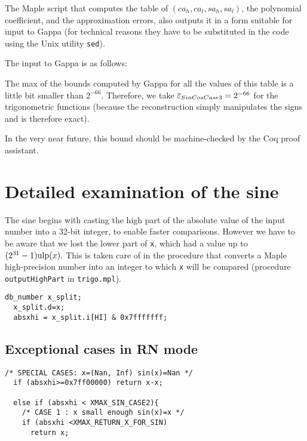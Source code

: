 The Maple script that computes the table of $(ca_h,ca_l,sa_h,sa_l)$,
the polynomial coefficient, and the approximation errors, also outputs
it in a form suitable for input to Gappa (for technical reasons they
have to be substituted in the code using the Unix utility
\texttt{sed}).  

The input to Gappa is as follows:





The max of the bounds computed by Gappa for all the
values of this table is a little bit smaller than $2^{-66}$.
Therefore, we take ${\overline{\varepsilon}}_{SinCosCase3}=2^{-66}$ for the
trigonometric functions (because the reconstruction simply manipulates
the signs and is therefore exact).

In the very near future, this bound should be machine-checked by the
Coq proof assistant.



\section{Detailed examination of the sine}

The sine begins with casting the high part of the absolute value of
the input number into a 32-bit integer, to enable faster comparisons.
However we have to be aware that we lost the lower part of \texttt{x},
which had a value up to $(2^{31}-1)\mbox{ulp}(x)$. This is taken care of in
the procedure that converts a Maple high-precision number into an
integer to which \texttt{x} will be compared (procedure
\texttt{outputHighPart} in \texttt{trigo.mpl}).

\begin{lstlisting}[caption={Casting to an int for faster comparisons \label{lst:trigo:takehighpart}},firstnumber=1]
  db_number x_split;
  x_split.d=x;
  absxhi = x_split.i[HI] & 0x7fffffff;
\end{lstlisting}


\subsection{Exceptional cases in RN mode}
\begin{lstlisting}[caption={Exceptional cases for sine RN},firstnumber=1]
  /* SPECIAL CASES: x=(Nan, Inf) sin(x)=Nan */
  if (absxhi>=0x7ff00000) return x-x;    
   
  else if (absxhi < XMAX_SIN_CASE2){
    /* CASE 1 : x small enough sin(x)=x */
    if (absxhi <XMAX_RETURN_X_FOR_SIN)
      return x;
\end{lstlisting}

